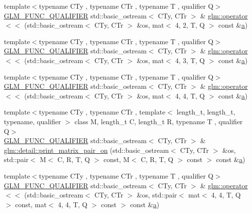 \begin{DoxyCompactItemize}
\item 
{\footnotesize template$<$typename C\+Ty , typename C\+Tr , typename T , qualifier Q$>$ }\\\hyperlink{setup_8hpp_a33fdea6f91c5f834105f7415e2a64407}{G\+L\+M\+\_\+\+F\+U\+N\+C\+\_\+\+Q\+U\+A\+L\+I\+F\+I\+ER} std\+::basic\+\_\+ostream$<$ C\+Ty, C\+Tr $>$ \& \hyperlink{group__gtx__io_gae565f5723d3912d17e295953290fd04b}{glm\+::operator$<$$<$} (std\+::basic\+\_\+ostream$<$ C\+Ty, C\+Tr $>$ \&os, mat$<$ 4, 2, T, Q $>$ const \&\hyperlink{_s_d_l__opengl__glext_8h_a3309789fc188587d666cda5ece79cf82}{a})
\item 
{\footnotesize template$<$typename C\+Ty , typename C\+Tr , typename T , qualifier Q$>$ }\\\hyperlink{setup_8hpp_a33fdea6f91c5f834105f7415e2a64407}{G\+L\+M\+\_\+\+F\+U\+N\+C\+\_\+\+Q\+U\+A\+L\+I\+F\+I\+ER} std\+::basic\+\_\+ostream$<$ C\+Ty, C\+Tr $>$ \& \hyperlink{group__gtx__io_ga203dc1828e9c231fed8dc8c000db2e17}{glm\+::operator$<$$<$} (std\+::basic\+\_\+ostream$<$ C\+Ty, C\+Tr $>$ \&os, mat$<$ 4, 3, T, Q $>$ const \&\hyperlink{_s_d_l__opengl__glext_8h_a3309789fc188587d666cda5ece79cf82}{a})
\item 
{\footnotesize template$<$typename C\+Ty , typename C\+Tr , typename T , qualifier Q$>$ }\\\hyperlink{setup_8hpp_a33fdea6f91c5f834105f7415e2a64407}{G\+L\+M\+\_\+\+F\+U\+N\+C\+\_\+\+Q\+U\+A\+L\+I\+F\+I\+ER} std\+::basic\+\_\+ostream$<$ C\+Ty, C\+Tr $>$ \& \hyperlink{group__gtx__io_ga269b4fa07fb9fe97faee573e9ccd9306}{glm\+::operator$<$$<$} (std\+::basic\+\_\+ostream$<$ C\+Ty, C\+Tr $>$ \&os, mat$<$ 4, 4, T, Q $>$ const \&\hyperlink{_s_d_l__opengl__glext_8h_a3309789fc188587d666cda5ece79cf82}{a})
\item 
{\footnotesize template$<$typename C\+Ty , typename C\+Tr , template$<$ length\+\_\+t, length\+\_\+t, typename, qualifier $>$ class M, length\+\_\+t C, length\+\_\+t R, typename T , qualifier Q$>$ }\\\hyperlink{setup_8hpp_a33fdea6f91c5f834105f7415e2a64407}{G\+L\+M\+\_\+\+F\+U\+N\+C\+\_\+\+Q\+U\+A\+L\+I\+F\+I\+ER} std\+::basic\+\_\+ostream$<$ C\+Ty, C\+Tr $>$ \& \hyperlink{namespaceglm_1_1detail_a5b82ceb67c3495960b07267d105170c5}{glm\+::detail\+::print\+\_\+matrix\+\_\+pair\+\_\+on} (std\+::basic\+\_\+ostream$<$ C\+Ty, C\+Tr $>$ \&os, std\+::pair$<$ M$<$ C, R, T, Q $>$ const, M$<$ C, R, T, Q $>$ const $>$ const \&\hyperlink{_s_d_l__opengl__glext_8h_a3309789fc188587d666cda5ece79cf82}{a})
\item 
{\footnotesize template$<$typename C\+Ty , typename C\+Tr , typename T , qualifier Q$>$ }\\\hyperlink{setup_8hpp_a33fdea6f91c5f834105f7415e2a64407}{G\+L\+M\+\_\+\+F\+U\+N\+C\+\_\+\+Q\+U\+A\+L\+I\+F\+I\+ER} std\+::basic\+\_\+ostream$<$ C\+Ty, C\+Tr $>$ \& \hyperlink{group__gtx__io_gae88c98b45bbff402d42b08bcea9922cb}{glm\+::operator$<$$<$} (std\+::basic\+\_\+ostream$<$ C\+Ty, C\+Tr $>$ \&os, std\+::pair$<$ mat$<$ 4, 4, T, Q $>$ const, mat$<$ 4, 4, T, Q $>$ const $>$ const \&\hyperlink{_s_d_l__opengl__glext_8h_a3309789fc188587d666cda5ece79cf82}{a})
\end{DoxyCompactItemize}


